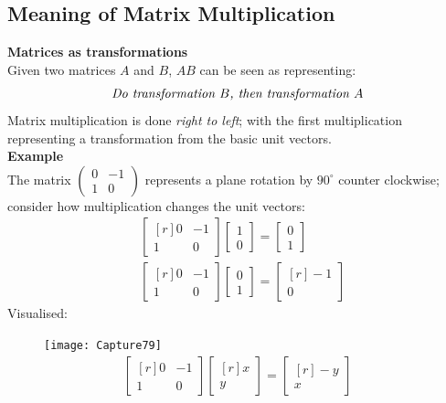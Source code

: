 \documentclass{report}
\begin{document}
\subsection{Meaning of Matrix Multiplication} %
\textbf{Matrices as transformations}\\
Given two matrices $A$ and $B$, $AB$ can be seen as 
representing:
\begin{equation*}
\text{\textit{Do transformation $B$, then transformation $A$}}
\end{equation*}
Matrix multiplication is done \textit{right to left}; with the first multiplication representing
a transformation from the basic unit vectors.\\
\textbf{Example}\\
The matrix $\left(\begin{smallmatrix}0&-1\\1&0\end{smallmatrix}\right)$ represents a 
plane rotation by $90^{\circ}$ counter clockwise;
consider how multiplication changes the unit vectors:
\begin{align*}
&\begin{bmatrix*}[r]
0&-1\\1&0
\end{bmatrix*}
\begin{bmatrix}
1\\0
\end{bmatrix}
=\begin{bmatrix}
0\\1
\end{bmatrix}\\
&\begin{bmatrix*}[r]
0&-1\\1&0
\end{bmatrix*}
\begin{bmatrix}
0\\1
\end{bmatrix}
=\begin{bmatrix*}[r]
-1\\0
\end{bmatrix*}
\end{align*}
Visualised:
\begin{figure}[h]
\texttt{[image: Capture79]}\\
\centering
\begin{align*}
\begin{bmatrix*}[r]
0&-1\\1&0
\end{bmatrix*}
\begin{bmatrix*}[r]
x\\y
\end{bmatrix*}
=\begin{bmatrix*}[r]
-y\\x
\end{bmatrix*}
\end{align*}
\end{figure}\\
\end{document}

